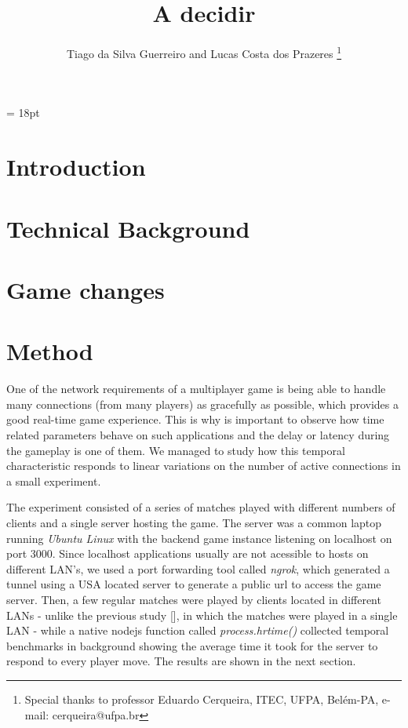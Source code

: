 \documentclass[english]{sbrt}
\begin{document}

\title{A decidir}

\author{Tiago da Silva Guerreiro and Lucas Costa dos Prazeres
  \thanks{Special thanks to professor Eduardo Cerqueira, ITEC, UFPA, Belém-PA, e-mail: cerqueira@ufpa.br}
}

\maketitle

\baselineskip = 18pt


\begin{abstract}

\end{abstract}

\begin{keywords}

\end{keywords}

\section{\textbf{Introduction}}

\section{\textbf{Technical Background}}

\section{\textbf{Game changes}}

\section{\textbf{Method}}

One of the network requirements of a multiplayer game is being able to handle many connections (from many players) as gracefully as possible, which provides a good real-time game experience. This is why is important to observe how time related parameters behave on such applications and the delay or latency during the gameplay is one of them. We managed to study how this temporal characteristic responds to linear variations on the number of active connections in a small experiment.

The experiment consisted of a series of matches played with different numbers of clients and a single server hosting the game.
The server was a common laptop running \textit{Ubuntu Linux} with the backend game instance listening on localhost on port 3000. Since localhost applications usually are not acessible to hosts on different LAN's, we used a port forwarding tool called \textit{ngrok}, which generated a tunnel using a USA located server to generate a public url to access the game server. Then, a few regular matches were played by clients located in different LANs - unlike the previous study [], in which the matches were played in a single LAN - while a native nodejs function called \textit{process.hrtime()} collected temporal benchmarks in background showing the average time it took for the server to respond to every player move. The results are shown in the next section.
\end{document}
